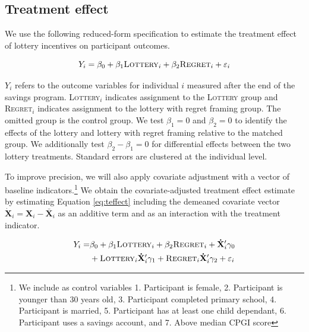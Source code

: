 \documentclass[11pt]{article}
\begin{document}
	\subsection{Treatment effect}

		We use the following reduced-form specification to estimate the treatment effect of lottery incentives on participant outcomes.

		\begin{equation} \label{eq:teffect}
			Y_{i} = \beta_{0} + \beta_{1}\text{\textsc{Lottery}}_{i} + \beta_{2}\text{\textsc{Regret}}_{i} + \varepsilon_{i}
		\end{equation}

		$Y_{i}$ refers to the outcome variables for individual $i$ measured after the end of the savings program. \textsc{Lottery}$_i$ indicates assignment to the \textsc{Lottery} group and \textsc{Regret}$_i$ indicates assignment to the lottery with regret framing group. The omitted group is the control group. We test $\beta_{1} = 0$ and $\beta_{2} = 0$ to identify the effects of the lottery and lottery with regret framing relative to the matched group. We additionally test $\beta_{2} - \beta_{1} = 0$ for differential effects between the two lottery treatments. Standard errors are clustered at the individual level.

		To improve precision, we will also apply covariate adjustment with a vector of baseline indicators.\footnote{We include as control variables 1. Participant is female, 2. Participant is younger than 30 years old, 3. Participant completed primary school, 4. Participant is married, 5. Participant has at least one child dependant, 6. Participant uses a savings account, and 7. Above median CPGI score} We obtain the covariate-adjusted treatment effect estimate by estimating Equation \ref{eq:teffect} including the demeaned covariate vector $\mathbf{\dot X}_{i} = \mathbf{X}_{i} - \mathbf{\bar X}_{i}$ as an additive term and as an interaction with the treatment indicator.

		\begin{equation} \begin{split} \label{eq:controls}
			Y_{i} = & \beta_{0} + \beta_{1}\text{\textsc{Lottery}}_{i} + \beta_{2}\text{\textsc{Regret}}_{i} + \mathbf{\dot X}'_i \gamma_{0} \\
					& + \text{\textsc{Lottery}}_{i} \mathbf{\dot X}'_i \gamma_{1} + \text{\textsc{Regret}}_{i} \mathbf{\dot X}'_i \gamma_{2} + \varepsilon_{i}
		\end{split} \end{equation}
\end{document}
